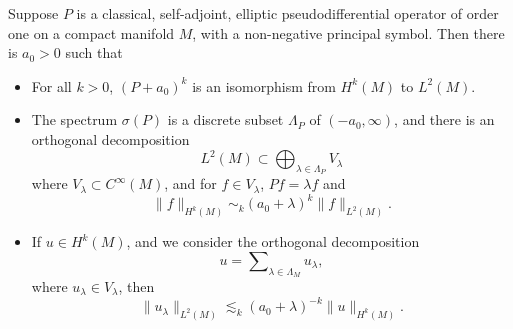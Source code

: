 \begin{theorem}
    Suppose $P$ is a classical, self-adjoint, elliptic pseudodifferential operator of order one on a compact manifold $M$, with a non-negative principal symbol. Then there is $a_0 > 0$ such that
    \begin{itemize}
        \item For all $k > 0$, $(P + a_0)^k$ is an isomorphism from $H^k(M)$ to $L^2(M)$.

        \item The spectrum $\sigma(P)$ is a discrete subset $\Lambda_P$ of $(-a_0,\infty)$, and there is an orthogonal decomposition
        \[ L^2(M) \subset \bigoplus\nolimits_{\lambda \in \Lambda_P} V_\lambda \]
        where $V_\lambda \subset C^\infty(M)$, and for $f \in V_\lambda$, $Pf = \lambda f$ and
        \[ \| f \|_{H^k(M)} \sim_k (a_0 + \lambda)^k \| f \|_{L^2(M)}. \]

        \item If $u \in H^k(M)$, and we consider the orthogonal decomposition
        \[ u = \sum\nolimits_{\lambda \in \Lambda_M} u_\lambda, \]
        where $u_\lambda \in V_\lambda$, then
        \[ \| u_\lambda \|_{L^2(M)} \lesssim_k (a_0 + \lambda)^{-k} \| u \|_{H^k(M)}. \]
    \end{itemize}
\end{theorem}
